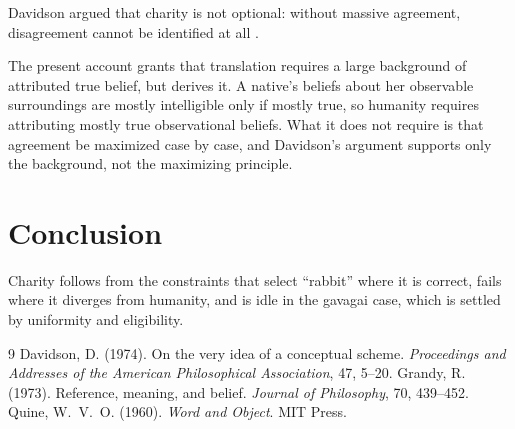 \documentclass{situationist-preprint}
\begin{document}
\begin{objection}
Davidson argued that charity is not optional: without massive agreement, disagreement cannot be identified at all \citep{Davidson1974}.
\end{objection}

\begin{reply}
The present account grants that translation requires a large background of attributed true belief, but derives it. A native's beliefs about her observable surroundings are mostly intelligible only if mostly true, so humanity requires attributing mostly true observational beliefs. What it does not require is that agreement be maximized case by case, and Davidson's argument supports only the background, not the maximizing principle.
\end{reply}

\section{Conclusion}

Charity follows from the constraints that select \enquote{rabbit} where it is correct, fails where it diverges from humanity, and is idle in the gavagai case, which is settled by uniformity and eligibility.

\begin{thebibliography}{9}\small
{} Davidson, D. (1974). On the very idea of a conceptual scheme. \emph{Proceedings and Addresses of the American Philosophical Association}, 47, 5--20.
 Grandy, R. (1973). Reference, meaning, and belief. \emph{Journal of Philosophy}, 70, 439--452.
 Quine, W.~V.~O. (1960). \emph{Word and Object}. MIT Press.
\end{thebibliography}
\end{document}
